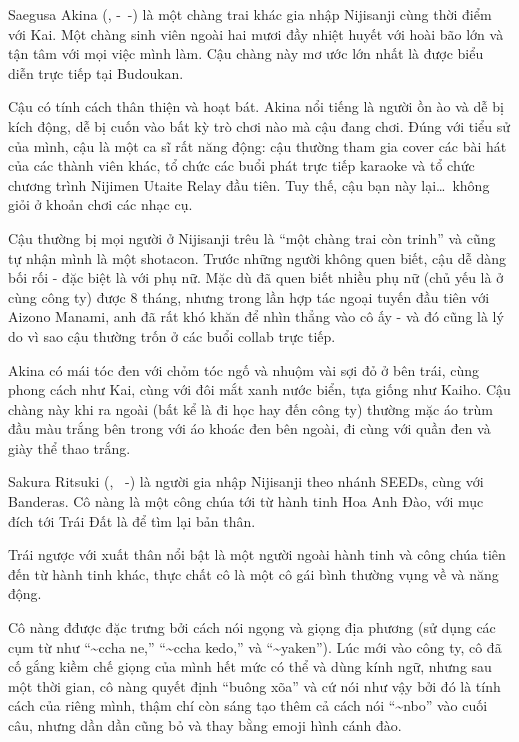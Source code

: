 \documentclass[../main.tex]{subfiles}
\begin{document}

Saegusa Akina (, -\ -) là một chàng trai khác gia nhập Nijisanji cùng thời điểm với Kai. Một chàng sinh viên ngoài hai mươi đầy nhiệt huyết với hoài bão lớn và tận tâm với mọi việc mình làm. Cậu chàng này mơ ước lớn nhất là được biểu diễn trực tiếp tại Budoukan.

Cậu có tính cách thân thiện và hoạt bát. Akina nổi tiếng là người ồn ào và dễ bị kích động, dễ bị cuốn vào bất kỳ trò chơi nào mà cậu đang chơi. Đúng với tiểu sử của mình, cậu là một ca sĩ rất năng động: cậu thường tham gia cover các bài hát của các thành viên khác, tổ chức các buổi phát trực tiếp karaoke và tổ chức chương trình Nijimen Utaite Relay đầu tiên. Tuy thế, cậu bạn này lại\dots\ không giỏi ở khoản chơi các nhạc cụ.

Cậu thường bị mọi người ở Nijisanji trêu là ``một chàng trai còn trinh'' và cũng tự nhận mình là một shotacon. Trước những người không quen biết, cậu dễ dàng bối rối - đặc biệt là với phụ nữ. Mặc dù đã quen biết nhiều phụ nữ (chủ yếu là ở cùng công ty) được 8 tháng, nhưng trong lần hợp tác ngoại tuyến đầu tiên với Aizono Manami, anh đã rất khó khăn để nhìn thẳng vào cô ấy - và đó cũng là lý do vì sao cậu thường trốn ở các buổi collab trực tiếp.

Akina có mái tóc đen với chỏm tóc ngố và nhuộm vài sợi đỏ ở bên trái, cùng phong cách như Kai, cùng với đôi mắt xanh nước biển, tựa giống như Kaiho. Cậu chàng này khi ra ngoài (bất kể là đi học hay đến công ty) thường mặc áo trùm đầu màu trắng bên trong với áo khoác đen bên ngoài, đi cùng với quần đen và giày thể thao trắng.


Sakura Ritsuki (, \ -) là người gia nhập Nijisanji theo nhánh SEEDs, cùng với Banderas. Cô nàng là một công chúa tới từ hành tinh Hoa Anh Đào, với mục đích tới Trái Đất là để tìm lại bản thân.

Trái ngược với xuất thân nổi bật là một người ngoài hành tinh và công chúa tiên đến từ hành tinh khác, thực chất cô là một cô gái bình thường vụng về và năng động.

Cô nàng đđược đặc trưng bởi cách nói ngọng và giọng địa phương (sử dụng các cụm từ như ``\~{}ccha ne,'' ``\~{}ccha kedo,'' và ``\~{}yaken''). Lúc mới vào công ty, cô đã cố gắng kiềm chế giọng của mình hết mức có thể và dùng kính ngữ, nhưng sau một thời gian, cô nàng quyết định ``buông xõa'' và cứ nói như vậy bởi đó là tính cách của riêng mình, thậm chí còn sáng tạo thêm cả cách nói ``\~{}nbo'' vào cuối câu, nhưng dần dần cũng bỏ và thay bằng emoji hình cánh đào.
\end{document}
